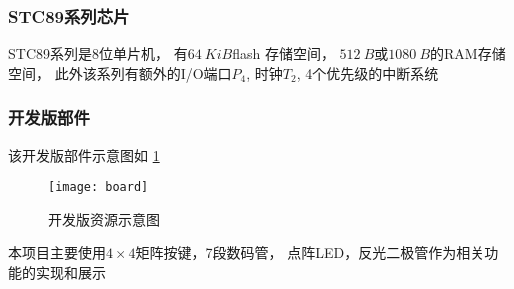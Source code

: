 \documentclass[../main.tex]{subfiles} %
\begin{document}
\subsubsection{STC89系列芯片}

  STC89系列是8位单片机，
  有$\SI{64}{KiB}$flash 存储空间，
  $\SI{512}{B}$或$\SI{1080}{B}$的RAM存储空间，
  此外该系列有额外的I/O端口$P_4$,
  时钟$T_2$,
  4个优先级的中断系统

\subsubsection{开发版部件}
  该开发版部件示意图如%
  \cref{fig:board}
  
  \begin{figure}[H]
    \centering
    \texttt{[image: board]}
    \caption{开发版资源示意图}
    \label{fig:board}
  \end{figure}
  本项目主要使用$4 \times 4$矩阵按键，7段数码管，
  点阵LED，反光二极管作为相关功能的实现和展示
\end{document}
